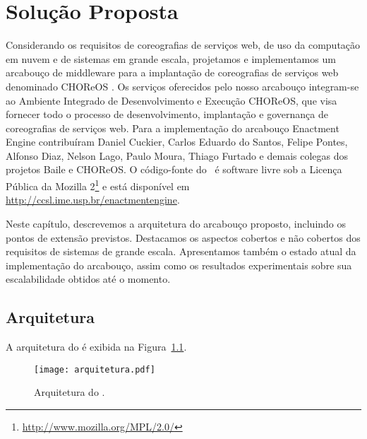 \chapter{Solução Proposta}
\label{cap:solucao}

Considerando os requisitos de coreografias de serviços web, de uso da computação em nuvem e de sistemas em grande escala, projetamos e implementamos um arcabouço de middleware para a implantação de coreografias de serviços web denominado CHOReOS \ee. Os serviços oferecidos pelo nosso arcabouço integram-se ao Ambiente Integrado de Desenvolvimento e Execução CHOReOS, que visa fornecer todo o processo de desenvolvimento, implantação e governança de coreografias de serviços web. Para a implementação do arcabouço Enactment Engine contribuíram Daniel Cuckier, Carlos Eduardo do Santos, Felipe Pontes, Alfonso Diaz, Nelson Lago, Paulo Moura, Thiago Furtado e demais colegas dos projetos Baile e CHOReOS. O código-fonte do \ee\ é software livre 
sob a Licença Pública da Mozilla 2\footnote{\url{http://www.mozilla.org/MPL/2.0/}} 
e está disponível em \url{http://ccsl.ime.usp.br/enactmentengine}. 

Neste capítulo, descrevemos a arquitetura do arcabouço proposto, incluindo os pontos de extensão previstos. Destacamos os aspectos cobertos e não cobertos dos requisitos de sistemas de grande escala. Apresentamos também o estado atual da implementação do arcabouço, assim como os resultados experimentais sobre sua escalabilidade obtidos até o momento.

\section{Arquitetura}


A arquitetura do \ee é exibida na Figura~\ref{fig:arquitetura}.

\begin{figure}[ht]
\centering
\texttt{[image: arquitetura.pdf]}
\caption{Arquitetura do \choreos \ee.}
\label{fig:arquitetura}
\end{figure}


